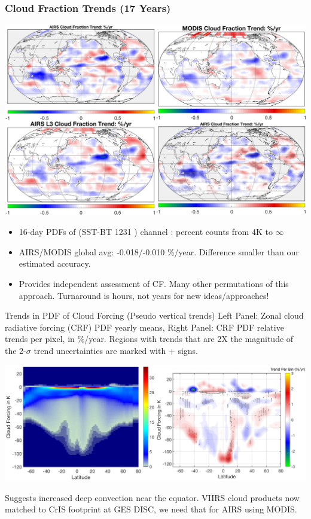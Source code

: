 \documentclass[10pt,t]{beamer}
\begin{document}
\begin{frame}
\frametitle{Cloud Fraction Trends (17 Years)}
\vspace{-0.1in}
\begin{center}
\includegraphics[width=0.85\linewidth]{./Yung/allrate4_small.png}
\end{center}

\vspace{-0.1in}
\footnotesize
\begin{itemize}
\item 16-day PDFs of (SST-BT 1231 \wn) channel : percent counts from 4K to $\infty$
\item AIRS/MODIS global avg: -0.018/-0.010 \%/year.  Difference smaller than our estimated accuracy.
\item Provides independent assessment of CF.  Many other permutations of this approach.  Turnaround is hours, not years for new ideas/approaches!
\end{itemize}
\end{frame}
\begin{frame}[label={sec:orge76b9d0}]{Trends in PDF of Cloud Forcing (Pseudo vertical trends)}
Left Panel: Zonal cloud radiative forcing (CRF) PDF yearly means, Right Panel: CRF PDF relative trends per pixel, in \%/year.  Regions with trends that are 2X the magnitude of the 2-\(\sigma\) trend uncertainties are marked with + signs.
\begin{center}
\includegraphics[width=\linewidth]{./Yung/bt_forcing_summary.png}
\end{center}

\footnotesize Suggests increased deep convection near the equator.   VIIRS cloud products now matched to CrIS footprint at GES DISC, we need that for AIRS using MODIS.
\end{frame}
\end{document}
